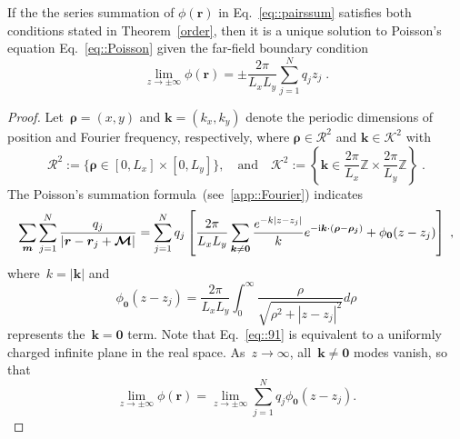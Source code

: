 \begin{prop}\label{prop::boundary}
	If the the series summation of $\phi(\bm{r})$ in Eq.~\eqref{eq::pairssum} satisfies both conditions stated in Theorem~\ref{order}, then it is a unique solution to Poisson's equation Eq.~\eqref{eq::Poisson} given the far-field boundary condition
	\begin{equation}\label{eq::boundary1}
		\lim_{z \to \pm \infty} \phi(\bm{r}) = \pm \frac{2\pi}{L_x L_y} \sum_{j=1}^{N} q_{j} z_{j}\;.
	\end{equation}
\end{prop}

\begin{proof}
	Let~$\bm{\rho}=(x,y)$ and $\bm{k}=(k_x, k_y)$ denote the periodic dimensions of position and Fourier frequency, respectively, where $\bm{\rho}\in\mathcal{R}^2$ and $\bm{k}\in\mathcal{K}^2$ with
	\begin{equation}
		\mathcal{R}^2:=\{\bm{\rho}\in[0,L_x]\times [0,L_y]\},\quad \text{and}\quad \mathcal{K}^2:=\left\{\bm{k}\in\frac{2\pi}{L_x}\mathbb{Z}\times \frac{2\pi}{L_y}\mathbb{Z}\right\}\;.
	\end{equation} 
	The Poisson's summation formula~(see~\ref{app::Fourier}) indicates 
	\begin{equation}\label{eq::9}
		\sum_{\boldsymbol{m}} \sum_{j = 1}^N \frac{q_{j}}{|\bm{r}-\bm{r}_{j} + \bm{\mathcal{M}}|} =  \sum_{j = 1}^N q_j \left[ \frac{2 \pi}{L_x L_y} \sum_{\bm{k} \neq \bm{0}} \frac{e^{-k \lvert z - z_j\rvert}}{k} e^{- \mathrm{i} \bm{k} \cdot (\bm{\rho} - \bm{\rho_j})} + \phi_{\bm{0}}(z-z_j)\right]\;,
	\end{equation}
	where~$k=|\bm{k}|$ and 
	\begin{equation}\label{eq::91}
		\phi_{\bm{0}}(z-z_j) = \frac{2\pi}{L_x L_y} \int_{0}^\infty \frac{ \rho}{\sqrt{\rho^2 + |z - z_j|^2}} d\rho
	\end{equation}
	represents the~$\bm{k}=\bm{0}$ term. Note that Eq.~\eqref{eq::91} is equivalent to a uniformly charged infinite plane in the real space. 
	As~$z \to \infty$, all~$\bm{k} \neq \bm{0}$ modes vanish, so that 
	\begin{equation}
		\lim_{z \to \pm \infty} \phi(\bm{r})=\lim_{z \to \pm \infty}\sum_{j=1}^{N}q_j\phi_{\bm{0}}(z-z_j).
	\end{equation}

\end{proof}
